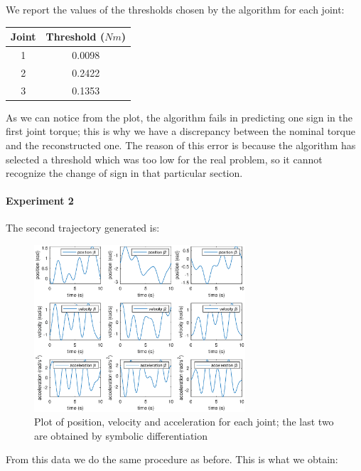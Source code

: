 \documentclass{article}
\begin{document}
We report the values of the thresholds chosen by the algorithm for each joint:

\begin{table}[!htbp]
\centering
\begin{tabular}{|c|c|}
\hline
Joint & Threshold ($Nm$)\\ 
\hline
1 & 0.0098\\
2 & 0.2422\\
3 & 0.1353\\
\hline
\end{tabular}
\end{table}
\FloatBarrier


As we can notice from the plot, the algorithm fails in predicting one sign in the first joint torque; this is why we have a discrepancy between the nominal torque and the reconstructed one. The reason of this error is because the algorithm has selected a threshold which was too low for the real problem, so it cannot recognize the change of sign in that particular section.

\paragraph{Experiment 2}
The second trajectory generated is:
\begin{figure}[!htbp]
\centering
\includegraphics[width=0.7\textwidth]{images/3-dof/trajectory456.eps}
\caption{Plot of position, velocity and acceleration for each joint; the last two are obtained by symbolic differentiation}
\end{figure}
\FloatBarrier

From this data we do the same procedure as before. This is what we obtain:
\end{document}
